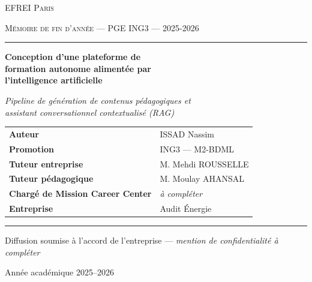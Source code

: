 \documentclass[12pt,a4paper]{article}
\begin{document}
\begin{titlepage}
\thispagestyle{empty}
\centering

{\scshape\large EFREI Paris \par}
\vspace{0.3cm}
{\scshape Mémoire de fin d'année --- PGE ING3 --- 2025-2026 \par}
\vspace{0.2cm}
\rule{\linewidth}{0.5pt}

\vfill

{\Huge\bfseries Conception d'une plateforme de\\[0.3cm]
formation autonome alimentée par\\[0.3cm]
l'intelligence artificielle \par}

\vspace{0.8cm}
{\large\itshape Pipeline de génération de contenus pédagogiques et\\
assistant conversationnel contextualisé (RAG)\par}

\vfill

\begin{tabular}{@{}ll@{}}
\textbf{Auteur} & ISSAD Nassim \\[0.3cm]
\textbf{Promotion} & ING3 --- M2-BDML \\[0.3cm]
\textbf{Tuteur entreprise} & M. Mehdi ROUSSELLE \\[0.3cm]
\textbf{Tuteur pédagogique} & M. Moulay AHANSAL \\[0.3cm]
\textbf{Chargé de Mission Career Center} & \textit{à compléter} \\[0.3cm]
\textbf{Entreprise} & Audit Énergie \\
\end{tabular}

\vfill

\rule{\linewidth}{0.5pt}
{\small Diffusion soumise à l'accord de l'entreprise --- \textit{mention de confidentialité à compléter}\par}
\vspace{0.3cm}
{\small Année académique 2025--2026\par}

\end{titlepage}

\clearpage
{}
{}
\end{document}

